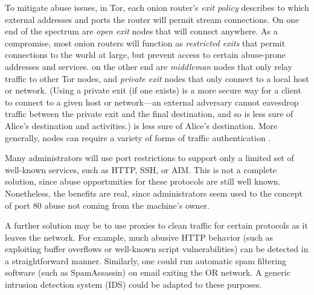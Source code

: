 \documentclass[times,10pt,twocolumn]{article}
\begin{document}
To mitigate abuse issues, in Tor, each onion router's \emph{exit
  policy} describes to which external addresses and ports the router
will permit stream connections. On one end of the spectrum are
\emph{open exit} nodes that will connect anywhere.  As a compromise,
most onion routers will function as \emph{restricted exits} that
permit connections to the world at large, but prevent access to
certain abuse-prone addresses and services.  on the other end are
\emph{middleman} nodes that only relay traffic to other Tor nodes, and
\emph{private exit} nodes that only connect to a local host or
network.  (Using a private exit (if one exists) is a more secure way
for a client to connect to a given host or network---an external
adversary cannot eavesdrop traffic between the private exit and the
final destination, and so is less sure of Alice's destination and
activities.)  is less sure of Alice's destination. More generally,
nodes can require a variety of forms of traffic authentication
\cite{or-discex00}.



Many administrators will use port restrictions to support only a
limited set of well-known services, such as HTTP, SSH, or AIM.
This is not a complete solution, since abuse opportunities for these
protocols are still well known.  Nonetheless, the benefits are real,
since administrators seem used to  the concept of port 80 abuse not
coming from the machine's owner.

A further solution may be to use proxies to clean traffic for certain
protocols as it leaves the network.  For example, much abusive HTTP
behavior (such as exploiting buffer overflows or well-known script
vulnerabilities) can be detected in a straightforward manner.
Similarly, one could run automatic spam filtering software (such as
SpamAssassin) on email exiting the OR network.  A generic
intrusion detection system (IDS) could be adapted to these purposes.
\end{document}
